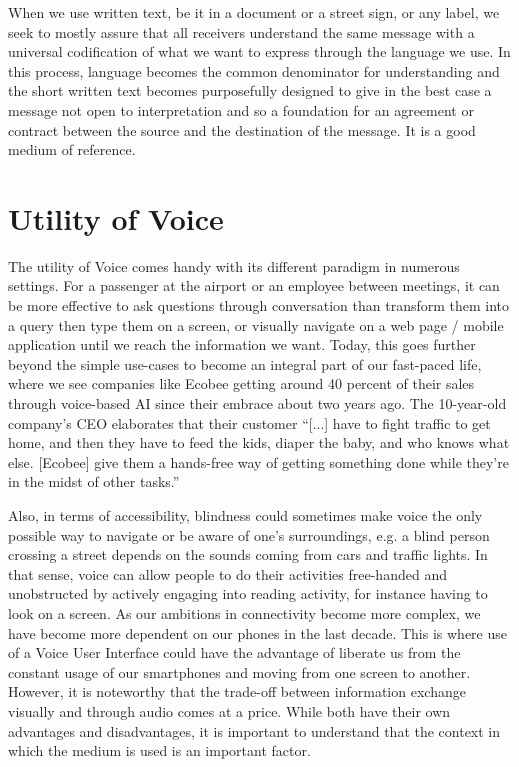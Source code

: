 
When we use written text, be it in a document or a street sign, or any label, we seek to mostly assure that all receivers understand the same message with a universal codification of what we want to express through the language we use. In this process, language becomes the common denominator for understanding and the short written text becomes purposefully designed to give in the best case a message not open to interpretation and so a foundation for an agreement or contract between the source and the destination of the message. It is a good medium of reference. 

\section{Utility of Voice}
The utility of Voice comes handy with its different paradigm in numerous settings. 
For a passenger at the airport or an employee between meetings, 
it can be more effective to ask questions through conversation than transform them into a query then type them on a screen,
or visually navigate on a web page / mobile application until we reach the information we want. 
Today, this goes further beyond the simple use-cases to become an integral part of our fast-paced life, where we see companies like Ecobee getting around 40 percent of their sales through voice-based AI \cite{mit:Alexa} since their embrace about two years ago. The 10-year-old company's CEO elaborates that their customer “[...] have to fight traffic to get home, and then they have to feed the kids, diaper the baby, and who knows what else. [Ecobee] give them a hands-free way of getting something done while they’re in the midst of other tasks.”


Also, in terms of accessibility, blindness could sometimes make voice the only possible way to navigate or be aware of one's surroundings, e.g. a blind person crossing a street depends on the sounds coming from cars and traffic lights.
In that sense, voice can allow people to do their activities free-handed and unobstructed by actively engaging into reading activity, for instance having to look on a screen.
As our ambitions in connectivity become more complex, we have become more dependent on our phones in the last decade.
This is where use of a Voice User Interface could have the advantage of liberate us from the constant usage of our smartphones and moving from one screen to another. 
However, it is noteworthy that the trade-off between information exchange visually and through audio comes at a price. While both have their own advantages and disadvantages, it is important to understand that the context in which the medium is used is an important factor.


